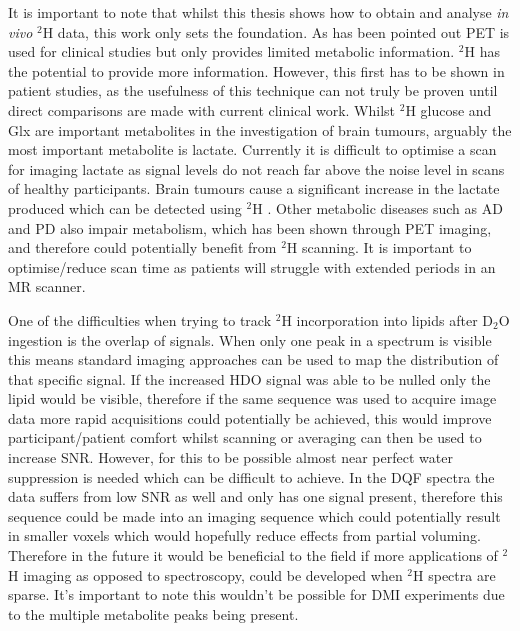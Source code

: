 
It is important to note that whilst this thesis shows how to obtain and analyse \textit{in vivo} $^2$H data, this work only sets the foundation. As has been pointed out \ac{PET}  is used for clinical studies but only provides limited metabolic information. $^2$H has the potential to provide more information. However, this first has to be shown in patient studies, as the usefulness of this technique can not truly be proven until direct comparisons are made with current clinical work. Whilst $^2$H glucose and Glx are important metabolites in the investigation of brain tumours, arguably the most important metabolite is lactate. Currently it is difficult to optimise a scan for imaging lactate as signal levels do not reach far above the noise level in scans of healthy participants. Brain tumours cause a significant increase in the lactate produced which can be detected using $^2$H \cite{Soares2009MagneticApplications}. Other metabolic diseases such as \ac{AD} and \ac{PD} also impair metabolism, which has been shown through \ac{PET} imaging\cite{Shokouhi2014ImagingTomography, Meles2017MetabolicDisease}, and therefore could potentially benefit from $^2$H scanning. It is important to optimise/reduce scan time as patients will struggle with extended periods in an MR scanner.

One of the difficulties when trying to track $^2$H incorporation into lipids after D$_2$O ingestion is the overlap of signals. When only one peak in a spectrum is visible this means standard imaging approaches can be used to map the distribution of that specific signal. If the increased \ac{HDO} signal was able to be nulled only the lipid would be visible, therefore if the same sequence was used to acquire image data more rapid acquisitions could potentially be achieved, this would improve participant/patient comfort whilst scanning or averaging can then be used to increase \ac{SNR}. However, for this to be possible almost near perfect water suppression is needed which can be difficult to achieve. In the \ac{DQF} spectra the data suffers from low \ac{SNR} as well and only has one signal present, therefore this sequence could be made into an imaging sequence which could potentially result in smaller voxels which would hopefully reduce effects from partial voluming. Therefore in the future it would be beneficial to the field if more applications of $^2$H imaging as opposed to spectroscopy, could be developed when $^2$H spectra are sparse. It's important to note this wouldn't be possible for \ac{DMI} experiments due to the multiple metabolite peaks being present.

